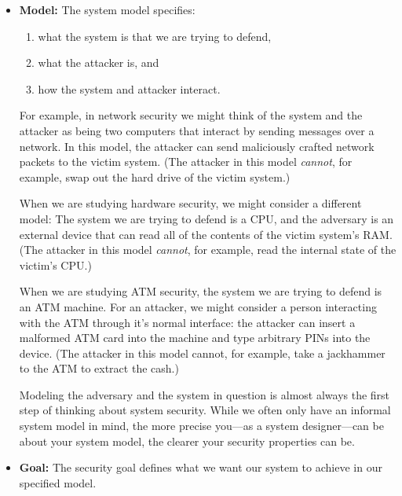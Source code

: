 \documentclass[
  letterpaper,
]{scrbook}
\providecommand{\tightlist}{%
  \setlength{\itemsep}{0pt}\setlength{\parskip}{0pt}}
\theoremstyle{definition}
\theoremstyle{plain}
\theoremstyle{plain}
\theoremstyle{remark}
\begin{document}
\begin{itemize}
\item
  \textbf{Model:} The system model specifies:


  \begin{enumerate}
  \def\labelenumi{\arabic{enumi}.}
  \tightlist
  \item
    what the system is that we are trying to defend,
  \item
    what the attacker is, and
  \item
    how the system and attacker interact.
  \end{enumerate}

  For example, in network security we might think of the system and the
  attacker as being two computers that interact by sending messages over
  a network. In this model, the attacker can send maliciously crafted
  network packets to the victim system. (The attacker in this model
  \emph{cannot}, for example, swap out the hard drive of the victim
  system.)

  When we are studying hardware security, we might consider a different
  model: The system we are trying to defend is a CPU, and the adversary
  is an external device that can read all of the contents of the victim
  system's RAM. (The attacker in this model \emph{cannot}, for example,
  read the internal state of the victim's CPU.)

  When we are studying ATM security, the system we are trying to defend
  is an ATM machine. For an attacker, we might consider a person
  interacting with the ATM through it's normal interface: the attacker
  can insert a malformed ATM card into the machine and type arbitrary
  PINs into the device. (The attacker in this model cannot, for example,
  take a jackhammer to the ATM to extract the cash.)

  Modeling the adversary and the system in question is almost always the
  first step of thinking about system security. While we often only have
  an informal system model in mind, the more precise you---as a system
  designer---can be about your system model, the clearer your security
  properties can be.
\item
  \textbf{Goal:} The security goal defines what we want our system to
  achieve in our specified model.


\end{itemize}
\end{document}
